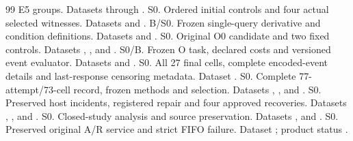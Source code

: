 \documentclass[10pt]{article}
\begin{document}
\begin{thebibliography}{99}
E5 groups. Datasets  through
.
 S0. Ordered initial controls and four actual selected
witnesses. Datasets  and
.
 B/S0. Frozen single-query derivative and condition
definitions. Datasets  and
.
 S0. Original O0 candidate and two fixed controls. Datasets
, ,
 and .
 S0/B. Frozen O task, declared costs and versioned event
evaluator. Datasets  and .
 S0. All 27 final cells, complete encoded-event details and
last-response censoring metadata. Dataset .
 S0. Complete 77-attempt/73-cell record, frozen methods and
selection. Datasets , ,
 and .
 S0. Preserved host incidents, registered repair and four
approved recoveries. Datasets ,
, 
and .
 S0. Closed-study analysis and source preservation.
Datasets , 
and .
 S0. Preserved original A/R service and strict FIFO failure.
Dataset ; product status .
\end{thebibliography}
\end{document}
